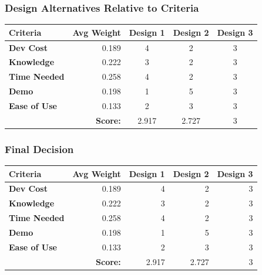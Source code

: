 \documentclass[12pt]{article}
\newcommand\cellhead[1]{\cellcolor{lightgray}\textbf{ #1 }}
\begin{document}
            \subsubsection{Design Alternatives Relative to Criteria}
                \begin{center}\begin{tabular}{|l|r|c|c|c|}
                    \hline
                    \cellhead{Criteria} & \cellhead{Avg Weight} & \cellhead{Design 1} & \cellhead{Design 2} & \cellhead{Design 3} \\\hline
                    \cellhead{Dev Cost} & 0.189 & 4 & 2 & 3 \\\hline
                    \cellhead{Knowledge} & 0.222 & 3 & 2 & 3 \\\hline
                    \cellhead{Time Needed} & 0.258 & 4 & 2 & 3 \\\hline
                    \cellhead{Demo} & 0.198 & 1 & 5 & 3 \\\hline
                    \cellhead{Ease of Use} & 0.133 & 2 & 3 & 3 \\\hline      
                     & \cellhead{Score:} & 2.917 & 2.727 & 3 \\\hline
                \end{tabular}\end{center}

            \subsubsection{Final Decision}
                \begin{center}\begin{tabular}{|l|r|r|r|r|}
                    \hline
                    \cellhead{Criteria} & \cellhead{Avg Weight} & \cellhead{Design 1} & \cellhead{Design 2} & \cellhead{Design 3} \\\hline
                    \cellhead{Dev Cost} & 0.189 & 4 & 2 & 3 \\\hline
                    \cellhead{Knowledge} & 0.222 & 3 & 2 & 3 \\\hline
                    \cellhead{Time Needed} & 0.258 & 4 & 2 & 3 \\\hline
                    \cellhead{Demo} & 0.198 & 1 & 5 & 3 \\\hline
                    \cellhead{Ease of Use} & 0.133 & 2 & 3 & 3 \\\hline
                    & \cellhead{Score:} & 2.917 & 2.727 & 3 \\\hline
                \end{tabular}\end{center}
        
\end{document}
